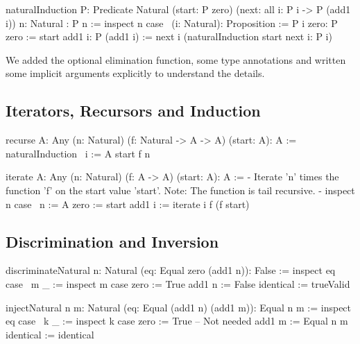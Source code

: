 \begin{alba}
    naturalInduction
        {P: Predicate Natural}
        (start: P zero)
        (next: all {i}: P i -> P (add1 i))
        {n: Natural}
        : P n
    :=
        inspect n case
            {\ (i: Natural): Proposition := P i}
            zero: P zero :=
                start
            add1 i: P (add1 i) :=
                next
                    {i}
                    (naturalInduction start next {i}: P i)
\end{alba}

We added the optional elimination function, some type annotations and written
some implicit arguments explicitly to understand the details.





\subsection{Iterators, Recursors and Induction}

\begin{alba}
    recurse {A: Any} (n: Natural) (f: Natural -> A -> A) (start: A): A :=
        naturalInduction
            {\ i := A}
            start
            f
            {n}

    iterate {A: Any} (n: Natural) (f: A -> A) (start: A): A :=
        {- Iterate 'n' times the function 'f' on the start value 'start'.
           Note: The function is tail recursive. -}
        inspect n case
            {\ n := A}
            zero :=
                start
            add1 i :=
                iterate i f (f start)
\end{alba}






\vskip 5mm
\subsection{Discrimination and Inversion}


\begin{alba}
    discriminateNatural {n: Natural} (eq: Equal zero (add1 n)): False :=
        inspect eq case
            { \ {m} _ :=
                inspect m case
                    zero :=
                        True
                    add1 n :=
                        False
            }
            identical :=
                trueValid


    injectNatural {n m: Natural} (eq: Equal (add1 n) (add1 m)): Equal n m :=
        inspect eq case
            { \ {k} _ :=
                inspect k case
                    zero :=
                        True  -- Not needed
                    add1 m :=
                        Equal n m}
            identical :=
                identical
\end{alba}








